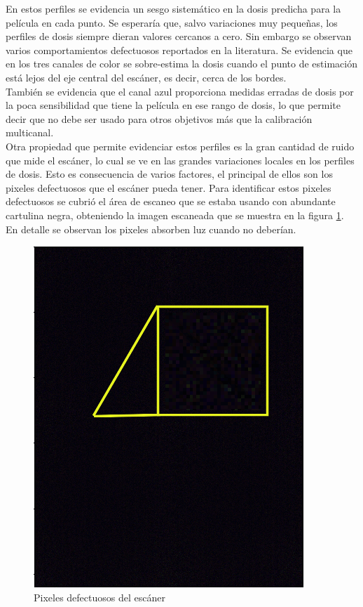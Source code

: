 En estos perfiles se evidencia un sesgo sistemático en la dosis predicha para la película en cada punto. Se esperaría que, salvo variaciones muy pequeñas, los perfiles de dosis siempre dieran valores cercanos a cero. Sin embargo se observan varios comportamientos defectuosos reportados en la literatura. Se evidencia que en los tres canales de color se sobre-estima la dosis cuando el punto de estimación está lejos del eje central del escáner, es decir, cerca de los bordes.\\

También se evidencia que el canal azul proporciona medidas erradas de dosis por la poca sensibilidad que tiene la película en ese rango de dosis, lo que permite decir que no debe ser usado para otros objetivos más que la calibración multicanal.\\

Otra propiedad que permite evidenciar estos perfiles es la gran cantidad de ruido que mide el escáner, lo cual se ve en las grandes variaciones locales en los perfiles de dosis. Esto es consecuencia de varios factores, el principal de ellos son los pixeles defectuosos que el escáner pueda tener. Para identificar estos pixeles defectuosos se cubrió el área de escaneo que se estaba usando con abundante cartulina negra, obteniendo la imagen escaneada que se muestra en la figura \ref{fig:fondoNegro}. En detalle se observan los pixeles absorben luz cuando no deberían. \\

\begin{figure}[H]
	\centering
	\includegraphics[width=0.7\linewidth]{images/fonRuido.png}
	\caption{Pixeles defectuosos del escáner }
	\label{fig:fondoNegro}
\end{figure}

